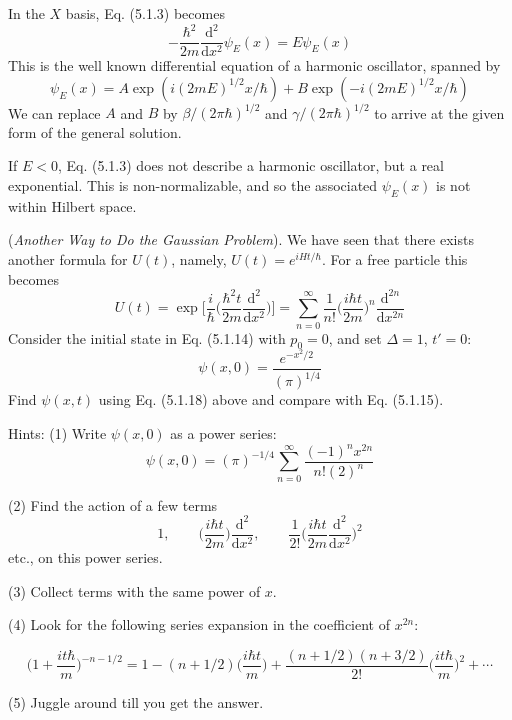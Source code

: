 \documentclass[../principles-of-quantum-mechanics.tex]{subfiles}
\begin{document}
\begin{questions}
		\begin{solution}
			In the $X$ basis, Eq. (5.1.3) becomes
			$$-\frac{\hbar^2}{2m}\frac{\mathrm{d}^2}{\mathrm{d}x^2}\psi_E(x) = E\psi_E(x)$$
			This is the well known differential equation of a harmonic oscillator, spanned by 
			$$\psi_E(x) = A\exp(i(2mE)^{1/2}x/\hbar) + B\exp(-i(2mE)^{1/2}x/\hbar)$$
			We can replace $A$ and $B$ by $\beta/(2\pi\hbar)^{1/2}$ and $\gamma/(2\pi\hbar)^{1/2}$ to arrive at the given form of the general solution.
			
			If $E < 0$, Eq. (5.1.3) does not describe a harmonic oscillator, but a real exponential. This is non-normalizable, and so the associated $\psi_E(x)$ is not within Hilbert space.
		\end{solution}
	
		\question (\textit{Another Way to Do the Gaussian Problem}). We have seen that there exists another formula for $U(t)$, namely, $U(t)=e^{iHt/\hbar}$. For a free particle this becomes
		$$U(t) = \exp\Big[\frac{i}{\hbar}\Big(\frac{\hbar^2t}{2m}\frac{\mathrm{d}^2}{\mathrm{d}x^2}\Big)\Big] = \sum_{n=0}^{\infty}\frac{1}{n!}\Big(\frac{i\hbar t}{2m}\Big)^n\frac{\mathrm{d}^{2n}}{\mathrm{d}x^{2n}}$$
		Consider the initial state in Eq. (5.1.14) with $p_0=0$, and set $\Delta = 1$, $t'=0$:
		$$\psi(x, 0) = \frac{e^{-x^2/2}}{(\pi)^{1/4}}$$
		Find $\psi(x, t)$ using Eq. (5.1.18) above and compare with Eq. (5.1.15).
		
		Hints: (1) Write $\psi(x, 0)$ as a power series:
		$$\psi(x, 0) = (\pi)^{-1/4}\sum_{n=0}^{\infty}\frac{(-1)^nx^{2n}}{n!(2)^n}$$
		
		(2) Find the action of a few terms
		$$1, \qquad \Big(\frac{i\hbar t}{2m}\Big) \frac{\mathrm{d}^2}{\mathrm{d}x^2},\qquad \frac{1}{2!}\Big(\frac{i\hbar t}{2m}\frac{\mathrm{d}^2}{\mathrm{d}x^2}\Big)^2$$
		etc., on this power series.
		
		(3) Collect terms with the same power of $x$.
		
		(4) Look for the following series expansion in the coefficient of $x^{2n}$:
		
		$$\Big(1 + \frac{it\hbar}{m}\Big)^{-n-1/2} = 1 - (n + 1/2)\Big(\frac{i\hbar t}{m}\Big) + \frac{(n + 1/2)(n + 3/2)}{2!}\Big(\frac{it\hbar}{m}\Big)^2 + \cdots$$
		
		(5) Juggle around till you get the answer.
		

\end{questions}
\end{document}

